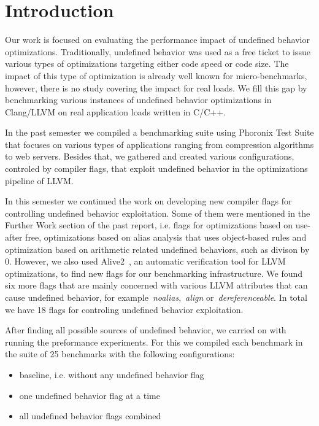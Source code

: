 \section{Introduction}

Our work is focused on evaluating the performance impact of undefined behavior
optimizations. Traditionally, undefined behavior was used as a free ticket to
issue various types of optimizations targeting either code speed or code size.
The impact of this type of optimization is already well known for
micro-benchmarks, however, there is no study covering the impact for real loads.
We fill this gap by benchmarking various instances of undefined behavior
optimizations in Clang/LLVM on real application loads written in C/C++.

In the past semester we compiled a benchmarking suite using Phoronix Test Suite
that focuses on various types of applications ranging from compression
algorithms to web servers. Besides that, we gathered and created various
configurations, controled by compiler flags, that exploit undefined behavior in
the optimizations pipeline of LLVM.

In this semester we continued the work on developing new compiler flags for
controlling undefined behavior exploitation. Some of them were mentioned in the
Further Work section of the past report, i.e. flags for optimizations based on
use-after free, optimizations based on alias analysis that uses object-based
rules and optimization based on arithmetic related undefined behaviors, such as
divison by 0. However, we also used Alive2~\cite{lopes2021alive2}, an automatic
verification tool for LLVM optimizations, to find new flags for our benchmarking
infrastructure. We found six more flags that are mainly concerned with various
LLVM attributes that can cause undefined behavior, for
example~\textit{noalias},~\textit{align} or~\textit{dereferenceable}. In total
we have 18 flags for controling undefined behavior exploitation.

After finding all possible sources of undefined behavior, we carried on with
running the preformance experiments. For this we compiled each benchmark in the
suite of 25 benchmarks with the following configurations:
\begin{itemize}
  \item baseline, i.e. without any undefined behavior flag
  \item one undefined behavior flag at a time
  \item all undefined behavior flags combined
\end{itemize}

